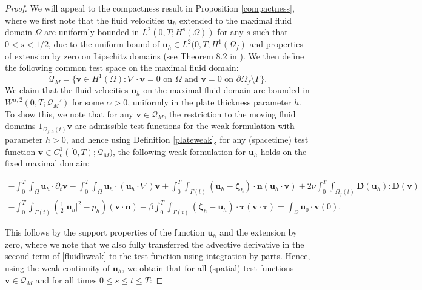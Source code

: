 \documentclass[11pt]{article}
\newcommand{\bd}{\boldsymbol}
\theoremstyle{definition}
\begin{document}
\begin{proof}
We will appeal to the compactness result in Proposition \ref{compactness}, where we first note that the fluid velocities $\bd{u}_{h}$ extended to the maximal fluid domain $\Omega$ are uniformly bounded in $L^{2}(0, T; H^{s}(\Omega))$ for any $s$ such that $0 < s < 1/2$, due to the uniform bound of $\bd{u}_{h} \in L^{2}(0, T; H^{1}(\Omega_{f})$ and properties of extension by zero on Lipschitz domains (see Theorem 8.2 in \cite{KuanTawri}). We then define the following common test space on the maximal fluid domain:
\begin{equation*}
\mathcal{Q}_{M} = \{\bd{v} \in H^{1}(\Omega) : \nabla \cdot \bd{v} = 0 \text{ on } \Omega \text{ and } \bd{v} = 0 \text{ on } \partial \Omega_{f} \setminus \Gamma\}.
\end{equation*}
We claim that the fluid velocities $\bd{u}_{h}$ on the maximal fluid domain are bounded in $W^{\alpha, 2}(0, T; \mathcal{Q}_{M}')$ for some $\alpha > 0$, uniformly in the plate thickness parameter $h$. To show this, we note that for any $\bd{v} \in \mathcal{Q}_{M}$, the restriction to the moving fluid domains $1_{\Omega_{f, h}(t)} \bd{v}$ are admissible test functions for the weak formulation with parameter $h > 0$, and hence using Definition \ref{plateweak}, for any (spacetime) test function $\bd{v} \in C_{c}^{1}([0, T); \mathcal{Q}_{M})$, the following weak formulation for $\bd{u}_{h}$ holds on the fixed maximal domain:
\begin{small}
\begin{multline}\label{fluidhweak}
-\int_{0}^{T} \int_{\Omega} \bd{u}_{h} \cdot \partial_{t} \bd{v} - \int_{0}^{T} \int_{\Omega} \bd{u}_{h} \cdot (\bd{u}_{h} \cdot \nabla) \bd{v} + \int_{0}^{T} \int_{\Gamma(t)} \left(\bd{u}_{h} - \bd{\zeta}_{h} \right) \cdot \bd{n} (\bd{u}_{h} \cdot \bd{v}) + 2\nu \int_{0}^{T} \int_{\Omega_{f}(t)} \bd{D}(\bd{u}_{h}) : \bd{D}(\bd{v}) \\
- \int_{0}^{T} \int_{\Gamma(t)} \left(\frac{1}{2}|\bd{u}_{h}|^{2} - p_{h}\right) (\bd{v} \cdot \bd{n}) - \beta \int_{0}^{T} \int_{\Gamma(t)} (\bd{\zeta}_{h} - \bd{u}_{h}) \cdot \bd{\tau} (\bd{v} \cdot \bd{\tau}) = \int_{\Omega} \bd{u}_{0} \cdot \bd{v}(0).
\end{multline}
\end{small}
This follows by the support properties of the function $\bd{u}_{h}$ and the extension by zero, where we note that we also fully transferred the advective derivative in the second term of \eqref{fluidhweak} to the test function using integration by parts. Hence, using the weak continuity of $\bd{u}_{h}$, we obtain that for all (spatial) test functions $\bd{v} \in \mathcal{Q}_{M}$ and for all times $0 \le s \le t \le T$:

\end{proof}
\end{document}
